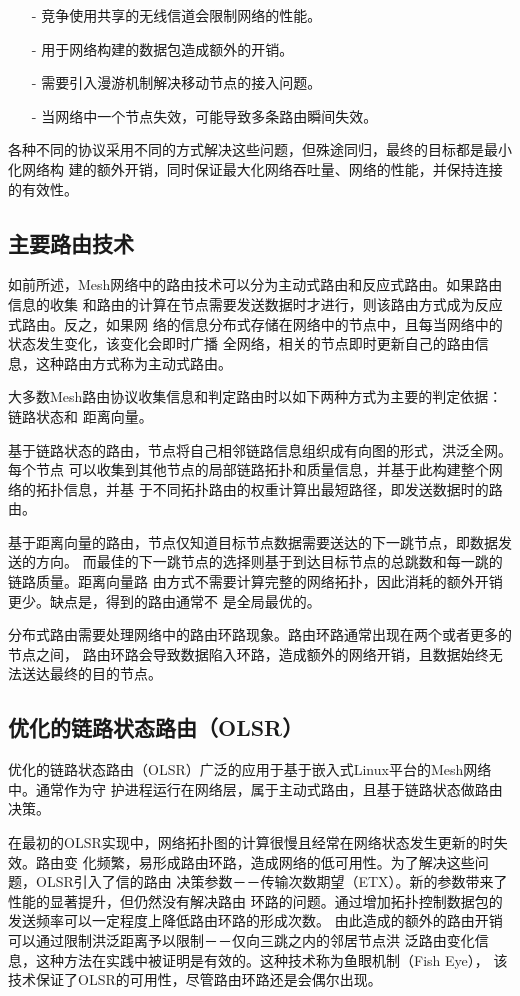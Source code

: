 \begin{itemize}
  \item[-] 竞争使用共享的无线信道会限制网络的性能。
  \item[-] 用于网络构建的数据包造成额外的开销。
  \item[-] 需要引入漫游机制解决移动节点的接入问题。
  \item[-] 当网络中一个节点失效，可能导致多条路由瞬间失效。
\end{itemize}

各种不同的协议采用不同的方式解决这些问题，但殊途同归，最终的目标都是最小化网络构
建的额外开销，同时保证最大化网络吞吐量、网络的性能，并保持连接的有效性。

\subsection{主要路由技术}
如前所述，Mesh网络中的路由技术可以分为主动式路由和反应式路由。如果路由信息的收集
和路由的计算在节点需要发送数据时才进行，则该路由方式成为反应式路由。反之，如果网
络的信息分布式存储在网络中的节点中，且每当网络中的状态发生变化，该变化会即时广播
全网络，相关的节点即时更新自己的路由信息，这种路由方式称为主动式路由。

大多数Mesh路由协议收集信息和判定路由时以如下两种方式为主要的判定依据：链路状态和
距离向量。

基于链路状态的路由，节点将自己相邻链路信息组织成有向图的形式，洪泛全网。每个节点
可以收集到其他节点的局部链路拓扑和质量信息，并基于此构建整个网络的拓扑信息，并基
于不同拓扑路由的权重计算出最短路径，即发送数据时的路由。

基于距离向量的路由，节点仅知道目标节点数据需要送达的下一跳节点，即数据发送的方向。
而最佳的下一跳节点的选择则基于到达目标节点的总跳数和每一跳的链路质量。距离向量路
由方式不需要计算完整的网络拓扑，因此消耗的额外开销更少。缺点是，得到的路由通常不
是全局最优的。

分布式路由需要处理网络中的路由环路现象。路由环路通常出现在两个或者更多的节点之间，
路由环路会导致数据陷入环路，造成额外的网络开销，且数据始终无法送达最终的目的节点。

\subsection{优化的链路状态路由（OLSR）}
优化的链路状态路由（OLSR）广泛的应用于基于嵌入式Linux平台的Mesh网络中。通常作为守
护进程运行在网络层，属于主动式路由，且基于链路状态做路由决策。

在最初的OLSR实现中，网络拓扑图的计算很慢且经常在网络状态发生更新的时失效。路由变
化频繁，易形成路由环路，造成网络的低可用性。为了解决这些问题，OLSR引入了信的路由
决策参数－－传输次数期望（ETX）。新的参数带来了性能的显著提升，但仍然没有解决路由
环路的问题。通过增加拓扑控制数据包的发送频率可以一定程度上降低路由环路的形成次数。
由此造成的额外的路由开销可以通过限制洪泛距离予以限制－－仅向三跳之内的邻居节点洪
泛路由变化信息，这种方法在实践中被证明是有效的。这种技术称为鱼眼机制（Fish Eye），
该技术保证了OLSR的可用性，尽管路由环路还是会偶尔出现。

